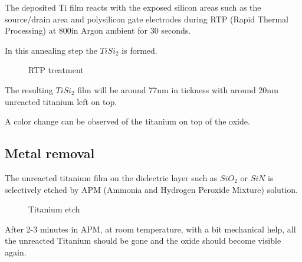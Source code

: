 The deposited Ti film reacts with the exposed silicon areas such as the source/drain area and polysilicon gate electrodes during RTP (Rapid Thermal Processing) at 800\degreesC in Argon ambient for 30 seconds.

In this annealing step the $Ti Si_2$ is formed.

\begin{figure}[H]
	\centering
	\begin{tikzpicture}[node distance = 3cm, auto, thick,scale=\CrossSectionOnly, every node/.style={transform shape}]
		
	\end{tikzpicture}
	\begin{tikzpicture}[node distance = 3cm, auto, thick,scale=\CrossSectionOnly, every node/.style={transform shape}]
		
	\end{tikzpicture}
	\caption{RTP treatment}
\end{figure}

The resulting $Ti Si_2$ film will be around 77nm in tickness with around 20nm unreacted titanium left on top.

A color change can be observed of the titanium on top of the oxide.

\subsection{Metal removal}

The unreacted titanium film on the dielectric layer such as $SiO_2$ or $SiN$ is selectively etched by APM (Ammonia and Hydrogen Peroxide Mixture) solution.

\begin{figure}[H]
	\centering
	\begin{tikzpicture}[node distance = 3cm, auto, thick,scale=\CrossSectionOnly, every node/.style={transform shape}]
		
	\end{tikzpicture}
	\begin{tikzpicture}[node distance = 3cm, auto, thick,scale=\CrossSectionOnly, every node/.style={transform shape}]
		
	\end{tikzpicture}
	\caption{Titanium etch}
\end{figure}

After 2-3 minutes in APM, at room temperature, with a bit mechanical help, all the unreacted Titanium should be gone and the oxide should become visible again.

